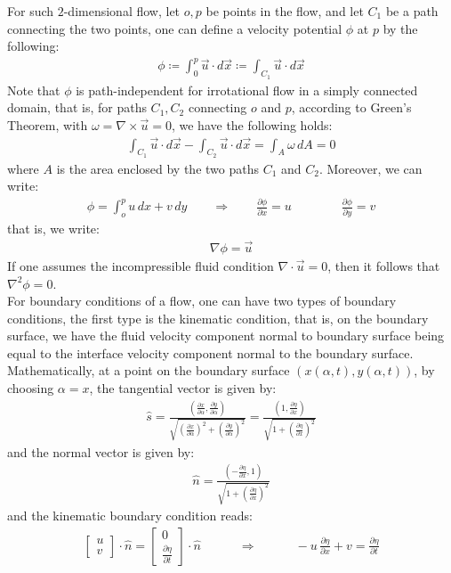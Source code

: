 \documentclass[11pt]{book}
\theoremstyle{break}
\theoremstyle{break}
\newcommand{\bmat}[1]{\begin{bmatrix} #1 \end{bmatrix}}
\begin{document}
For such $2$-dimensional flow, let $o,p$ be points in the flow, and let $C_1$ be a path connecting the two points, one can define a velocity potential $\phi$ at $p$ by the following:
\begin{align*}
\phi \coloneqq \int_0^p \vec{u}\cdot d\vec{x} \coloneqq \int_{C_1} \vec{u}\cdot d\vec{x}
\end{align*}
Note that $\phi$ is path-independent for irrotational flow in a simply connected domain, that is, for paths $C_1, C_2$ connecting $o$ and $p$, according to Green's Theorem, with $\omega = \nabla\times \vec{u} = 0$, we have the following holds:
\begin{align*}
\int_{C_1} \vec{u}\cdot d\vec{x} - \int_{C_2} \vec{u}\cdot d\vec{x} = \int_A \omega \, dA = 0
\end{align*}
where $A$ is the area enclosed by the two paths $C_1$ and $C_2$. Moreover, we can write:
\begin{align*}
\phi = \int_o^p u\, dx + v \, dy \qquad \Rightarrow \qquad \frac{\partial \phi}{\partial x} = u\qquad\qquad \frac{\partial \phi}{\partial y} = v
\end{align*}
that is, we write: 
\begin{align*}
\nabla \phi = \vec{u}
\end{align*}
If one assumes the incompressible fluid condition $\nabla \cdot \vec{u} = 0$, then it follows that $\nabla^2 \phi = 0$. \\

For boundary conditions of a flow, one can have two types of boundary conditions, the first type is the kinematic condition, that is, on the boundary surface, we have the fluid velocity component normal to boundary surface being equal to the interface velocity component normal to the boundary surface. Mathematically, at a point on the boundary surface $(x(\alpha,t), y(\alpha,t))$, by choosing $\alpha = x$, the tangential vector is given by:
\begin{align*}
\hat{s} = \frac{\left( \frac{\partial x}{\partial \alpha}, \frac{\partial y}{\partial \alpha}\right)}{\sqrt{\left( \frac{\partial x}{\partial \alpha}\right)^2 + \left( \frac{\partial y}{\partial \alpha}\right)^2 }} = \frac{\left( 1, \frac{\partial \eta}{\partial x}\right)}{\sqrt{1+\left( \frac{\partial \eta}{\partial x}\right)^2 }}
\end{align*}
and the normal vector is given by:
\begin{align*}
\hat{n} = \frac{\left( -\frac{\partial \eta}{\partial x}, 1 \right)}{\sqrt{1+ \left( \frac{\partial \eta}{\partial x}\right)^2}}
\end{align*}
and the kinematic boundary condition reads:
\begin{align*}
\bmat{u\\ v}\cdot \hat{n} = \bmat{0 \\ \frac{\partial \eta}{\partial t}}\cdot \hat{n}
\qquad\quad\Rightarrow\qquad\quad
-u \, \frac{\partial \eta}{\partial x} + v = \frac{\partial \eta}{ \partial t} \tag{K}
\end{align*}
\end{document}
